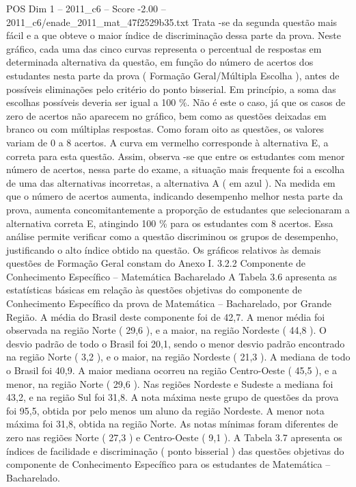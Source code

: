 \begin{textsample}{POS Dim 1 – 2011\_c6 – Score -2.00 – 2011\_c6/enade\_2011\_mat\_47f2529b35.txt}
Trata -se da segunda questão mais fácil e a que obteve o maior índice de discriminação dessa parte da prova.
Neste gráfico, cada uma das cinco curvas representa o percentual de respostas em determinada alternativa da questão, em função do número de acertos dos estudantes nesta parte da prova ( Formação Geral/Múltipla Escolha ), antes de possíveis eliminações pelo critério do ponto bisserial.
Em princípio, a soma das escolhas possíveis deveria ser igual a 100 \%.
Não é este o caso, já que os casos de zero de acertos não aparecem no gráfico, bem como as questões deixadas em branco ou com múltiplas respostas.
Como foram oito as questões, os valores variam de 0 a 8 acertos.
A curva em vermelho corresponde à alternativa E, a correta para esta questão.
Assim, observa -se que entre os estudantes com menor número de acertos, nessa parte do exame, a situação mais frequente foi a escolha de uma das alternativas incorretas, a alternativa A ( em azul ).
Na medida em que o número de acertos aumenta, indicando desempenho melhor nesta parte da prova, aumenta concomitantemente a proporção de estudantes que selecionaram a alternativa correta E, atingindo 100 \% para os estudantes com 8 acertos.
Essa análise permite verificar como a questão discriminou os grupos de desempenho, justificando o alto índice obtido na questão.
Os gráficos relativos às demais questões de Formação Geral constam do Anexo I. 3.2.2 Componente de Conhecimento Específico – Matemática Bacharelado A Tabela 3.6 apresenta as estatísticas básicas em relação às questões objetivas do componente de Conhecimento Específico da prova de Matemática – Bacharelado, por Grande Região.
A média do Brasil deste componente foi de 42,7.
A menor média foi observada na região Norte ( 29,6 ), e a maior, na região Nordeste ( 44,8 ).
O desvio padrão de todo o Brasil foi 20,1, sendo o menor desvio padrão encontrado na região Norte ( 3,2 ), e o maior, na região Nordeste ( 21,3 ).
A mediana de todo o Brasil foi 40,9.
A maior mediana ocorreu na região Centro-Oeste ( 45,5 ), e a menor, na região Norte ( 29,6 ).
Nas regiões Nordeste e Sudeste a mediana foi 43,2, e na região Sul foi 31,8.
A nota máxima neste grupo de questões da prova foi 95,5, obtida por pelo menos um aluno da região Nordeste.
A menor nota máxima foi 31,8, obtida na região Norte.
As notas mínimas foram diferentes de zero nas regiões Norte ( 27,3 ) e Centro-Oeste ( 9,1 ).
A Tabela 3.7 apresenta os índices de facilidade e discriminação ( ponto bisserial ) das questões objetivas do componente de Conhecimento Específico para os estudantes de Matemática – Bacharelado.

\end{textsample}
